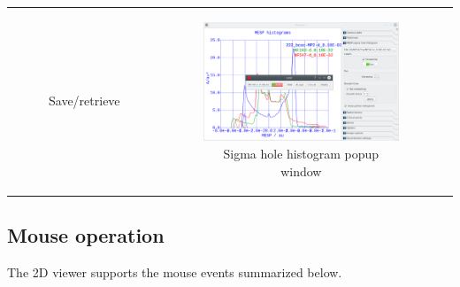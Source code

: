 \documentclass[10pt]{article}
\begin{document}
\begin{tabular}{lcr}
\begin{minipage}{.3\linewidth}
\begin{figure}[H]
\begin{center}
        \end{center}
        \vspace*{-1mm}
        \caption{Save/retrieve \label{fig:3_11}}
    \end{figure}
\end{minipage}
&
\begin{minipage}{.3\linewidth}
    \begin{figure}[H]
        \begin{center}
            \vspace*{3mm}
            \includegraphics[width=1.2\linewidth]{damqt320_sghist_popup.png}
        \end{center}
        \caption{Sigma hole histogram popup window\label{fig:3_12a}}
    \end{figure}
\end{minipage}
\end{tabular}


\subsection{Mouse operation\label{sec:3.10}}

The 2D viewer supports the mouse events summarized below.
\end{document}
